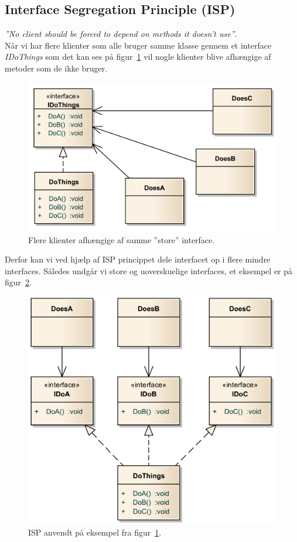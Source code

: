 \subsection{Interface Segregation Principle (ISP)}\label{sec:isp}
\textit{''No client should be forced to depend on methods it doesn't use''}.\\

Når vi har flere klienter som alle bruger samme klasse gennem et interface \textit{IDoThings} som det kan ses på figur~\ref{fig:ISP_bad} vil nogle klienter blive afhængige af metoder som de ikke bruger.

\begin{figure}[H]
	\centering
	\includegraphics[width=0.7\linewidth]{figs/ISP/ISP_bad}
	\caption{Flere klienter afhængige af samme ''store'' interface.}
	\label{fig:ISP_bad}
\end{figure}

Derfor kan vi ved hjælp af ISP princippet dele interfacet op i flere mindre interfaces. Således undgår vi store og uoverskuelige interfaces, et eksempel er på figur~\ref{fig:ISP_good}.

\begin{figure}[H]
	\centering
	\includegraphics[width=0.7\linewidth]{figs/ISP/ISP_good}
	\caption{ISP anvendt på eksempel fra figur~\ref{fig:ISP_bad}.}
	\label{fig:ISP_good}
\end{figure}


